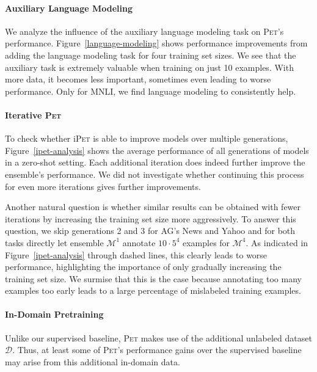 \paragraph{Auxiliary Language Modeling} We analyze the influence of the auxiliary language modeling task on \textsc{Pet}'s
performance. Figure~\ref{language-modeling} shows performance improvements from adding the language modeling task for four training set sizes. We see that the auxiliary task is extremely valuable when training on just 10 examples. With more data, it becomes less important, sometimes even leading to worse performance. Only for MNLI, we find language modeling to consistently help.

\paragraph{Iterative \textsc{Pet}}

To check whether i\textsc{Pet} is  able to improve models over multiple generations, Figure~\ref{ipet-analysis}
shows the average performance of all generations of models in a zero-shot setting. Each additional iteration does indeed further improve the ensemble's performance. We did not investigate whether continuing this process for even more iterations gives further improvements.

Another natural question is whether similar results can be obtained with fewer iterations by increasing the training set size more aggressively. To answer this question, we skip generations 2 and 3 for AG's News and Yahoo and for both tasks directly let ensemble $\mathcal{M}^1$ annotate $10\cdot5^4$ examples for
$\mathcal{M}^4$. As indicated in Figure~\ref{ipet-analysis}
through dashed lines, this clearly leads to worse performance, highlighting the importance of only gradually increasing the training set size. We surmise that this is the case because annotating too many examples too early leads to a large percentage of mislabeled training examples.

\paragraph{In-Domain Pretraining} Unlike our supervised baseline, \textsc{Pet} makes use of the additional unlabeled dataset $\mathcal{D}$. Thus, at least some of \textsc{Pet}'s
performance gains over the supervised baseline may arise from this additional in-domain data. 

